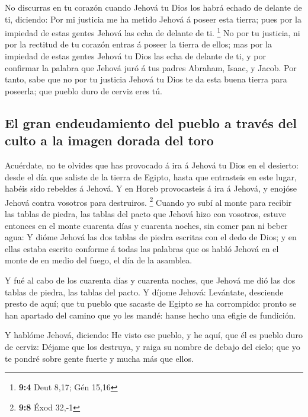  No discurras en tu corazón cuando Jehová tu Dios los habrá
echado de delante de ti, diciendo: Por mi justicia me ha metido Jehová á
poseer esta tierra; pues por la impiedad de estas gentes Jehová las echa
de delante de ti. \footnote{\textbf{9:4} Deut 8,17; Gén 15,16}
 No por tu justicia, ni por la rectitud de tu corazón entras
á poseer la tierra de ellos; mas por la impiedad de estas gentes Jehová
tu Dios las echa de delante de ti, y por confirmar la palabra que Jehová
juró á tus padres Abraham, Isaac, y Jacob.  Por tanto, sabe
que no por tu justicia Jehová tu Dios te da esta buena tierra para
poseerla; que pueblo duro de cerviz eres tú.

\hypertarget{el-gran-endeudamiento-del-pueblo-a-travuxe9s-del-culto-a-la-imagen-dorada-del-toro}{%
\subsection{El gran endeudamiento del pueblo a través del culto a la
imagen dorada del
toro}\label{el-gran-endeudamiento-del-pueblo-a-travuxe9s-del-culto-a-la-imagen-dorada-del-toro}}

 Acuérdate, no te olvides que has provocado á ira á Jehová
tu Dios en el desierto: desde el día que saliste de la tierra de Egipto,
hasta que entrasteis en este lugar, habéis sido rebeldes á Jehová.
 Y en Horeb provocasteis á ira á Jehová, y enojóse Jehová
contra vosotros para destruiros. \footnote{\textbf{9:8} Éxod 32,-1}
 Cuando yo subí al monte para recibir las tablas de piedra,
las tablas del pacto que Jehová hizo con vosotros, estuve entonces en el
monte cuarenta días y cuarenta noches, sin comer pan ni beber agua:
 Y dióme Jehová las dos tablas de piedra escritas con el
dedo de Dios; y en ellas estaba escrito conforme á todas las palabras
que os habló Jehová en el monte de en medio del fuego, el día de la
asamblea.

 Y fué al cabo de los cuarenta días y cuarenta noches, que
Jehová me dió las dos tablas de piedra, las tablas del pacto.
 Y díjome Jehová: Levántate, desciende presto de aquí; que
tu pueblo que sacaste de Egipto se ha corrompido: pronto se han apartado
del camino que yo les mandé: hanse hecho una efigie de fundición.

 Y hablóme Jehová, diciendo: He visto ese pueblo, y he
aquí, que él es pueblo duro de cerviz:  Déjame que los
destruya, y raiga su nombre de debajo del cielo; que yo te pondré sobre
gente fuerte y mucha más que ellos.


